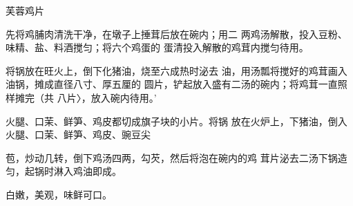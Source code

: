 \begin{recipe}{芙蓉鸡片}

\ingredients


\cooking

\step 	先将鸡脯肉清洗干净，在墩子上捶茸后放在碗内；用二 两鸡汤解散，投入豆粉、味精、盐、料酒搅匀；将六个鸡蛋的 蛋清投入解散的鸡茸内搅匀待用。

\step 	将锅放在旺火上，倒下化猪油，烧至六成热时泌去 油，用汤瓢将搅好的鸡茸画入油锅，摊成直径八寸、厚五厘的 圆片，铲起放入盛有二汤的碗内；将鸡茸一直照样摊完（共 八片〉，放入碗内待用。'

火腿、口茉、鲜笋、鸡皮都切成旗子块的小片。将锅 放在火炉上，下猪油，倒入火腿、口茉、鲜笋、鸡皮、豌豆尖

苞，炒动几转，倒下鸡汤四两，勾芡，然后将泡在碗内的鸡 茸片泌去二汤下锅造匀，起锅时淋入鸡油即成。

\notes

白嫩，美观，味鲜可口。

\end{recipe}

